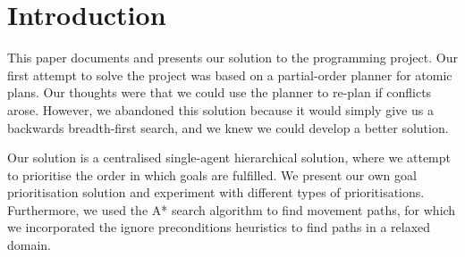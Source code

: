 \section{Introduction}
\label{sec:introduction}


This paper documents and presents our solution to the programming project.
Our first attempt to solve the project was based on a partial-order planner for atomic plans.
Our thoughts were that we could use the planner to re-plan if conflicts arose.
However, we abandoned this solution because it would simply give us a backwards breadth-first search, and we knew we could develop a better solution.

Our solution is a centralised single-agent hierarchical solution, where we attempt to prioritise the order in which goals are fulfilled.
We present our own goal prioritisation solution and experiment with different types of prioritisations.
Furthermore, we used the A* search algorithm to find movement paths, for which we incorporated the ignore preconditions heuristics to find paths in a relaxed domain.



